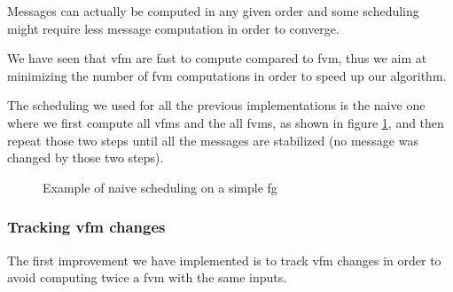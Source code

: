 \documentclass[a4paper,11pt]{report}
\newlength\gheight
\newlength\ndist
\newlength\fghskip
\newcommand{\fgargset}[1]{\pgfkeys{/factorgraph/.cd,#1}}
\newcommand{\factorgraph}[1][]{
    \begin{scope}
        \fgargset{#1}
        \pgfmathsetlength\gheight{\fgheight}
        \pgfmathsetlength\fghskip{0}
        \ifnum\fgnbv>1
            \pgfmathsetlength\ndist{\gheight/(\fgnbv-1)}
        \else
            \pgfmathsetlength\ndist{0}
            \ifnum\fgnbf>1
                \pgfmathsetlength\fghskip{-\gheight/2}
            \fi
        \fi
        \begin{scope}[shift={(0,\fghskip)},start chain=1 going {at=(\tikzchainprevious),shift=(-90:\ndist)}]
            \foreach \i in {1,...,\fgnbv} {
                    \node[on chain=1, ellipse, draw] (x_\i) {\fgvlabel};
            }
        \end{scope}
        \pgfmathsetlength\fghskip{0}
        \ifnum\fgnbf>1
            \pgfmathsetlength\ndist{\gheight/(\fgnbf-1)}
        \else
            \ifnum\fgnbv>1
                \pgfmathsetlength\fghskip{-\gheight/2}
            \fi
            \pgfmathsetlength\ndist{0}
        \fi
        \begin{scope}[shift={(\fgwidth,\fghskip)}, start chain=2 going {at=(\tikzchainprevious),shift=(-90:\ndist)}]
            \foreach \j in {1,...,\fgnbf} {
                \node[on chain=2, rectangle, draw] (f_\j) {\fgflabel};
            }
        \end{scope}
        \foreach \i/\j/\k in \fgedges {
            \ifnum\pdfstrcmp{\k}{vfm}=0
                \path (x_\i) -- node[sloped] (m_\i_\j) {$m_{\text{\fgvlabel} \to \text{\fgflabel}}$} (f_\j);
                \draw[-latex] (x_\i) -- (m_\i_\j) -- (f_\j);
            \else
                \ifnum\pdfstrcmp{\k}{fvm}=0
                    \path (x_\i) -- node[sloped] (m_\i_\j) {$m_{\text{\fgflabel} \to \text{\fgvlabel}}$} (f_\j);
                    \draw[-latex] (f_\j) -- (m_\i_\j) -- (x_\i);
                \else
                    \draw[-] (x_\i.east) -- (f_\j.west);
                \fi
            \fi
        }
    \end{scope}
}
\begin{document}
Messages can actually be computed in any given order and some scheduling might require less message computation in order to converge.

We have seen that \ac{vfm} are fast to compute compared to \ac{fvm}, thus we aim at minimizing the number of \ac{fvm} computations in order to speed up our algorithm.

The scheduling we used for all the previous implementations is the naive one where we first compute all \acp{vfm} and the all \acp{fvm}, as shown in figure \ref{fig:naiveschedule}, and then repeat those two steps until all the messages are stabilized (no message was changed by those two steps).

\begin{figure}[!ht]
    \centering
    \hspace{1cm}
    \caption{Example of naive scheduling on a simple \ac{fg}}
    \label{fig:naiveschedule}
\end{figure}

\subsubsection{Tracking \ac{vfm} changes}
\label{sec:skip}

The first improvement we have implemented is to track \ac{vfm} changes in order to avoid computing twice a \ac{fvm} with the same inputs.
\end{document}
